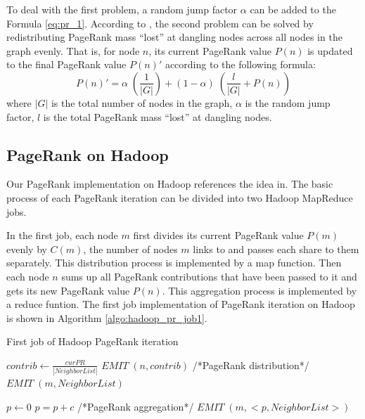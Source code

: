 \documentclass[10pt,conference,compsocconf]{IEEEtran}
\begin{document}
To deal with the first problem, a random jump factor $\alpha$ can be added to the Formula \ref{eq:pr_1}. According to \cite{monica2005}, the second problem can be solved by redistributing PageRank mass ``lost'' at dangling nodes across all nodes in the graph evenly. That is, for node $n$, its current PageRank value $P(n)$ is updated to the final PageRank value $P(n)'$ according to the following formula:
\begin{equation}
P(n)' = \alpha \; (\frac{1}{|G|}) + (1 - \alpha) \; (\frac{l}{|G|} + P(n)) \label{eq:pr_2}
\end{equation}
where $|G|$ is the total number of nodes in the graph, $\alpha$ is the random jump factor, $l$ is the total PageRank mass ``lost'' at dangling nodes.


\subsection{PageRank on Hadoop}
Our PageRank implementation on Hadoop references the idea in\cite{jimmy2010}. The basic process of each PageRank iteration can be divided into two Hadoop MapReduce jobs.

In the first job, each node $m$ first divides its current PageRank value $P(m)$ evenly by $C(m)$, the number of nodes $m$ links to and passes each share to them separately. This distribution process is implemented by a map function. Then each node $n$ sums up all PageRank contributions that have been passed to it and gets its new PageRank value $P(n)$. This aggregation process is implemented by a reduce funtion. The first job implementation of PageRank iteration on Hadoop is shown in Algorithm \ref{algo:hadoop_pr_job1}. 


\begin{algorithm}[!t]
\caption{First job of Hadoop PageRank iteration}
\label{algo:hadoop_pr_job1}
\begin{algorithmic}[1]
    \State $contrib \leftarrow \frac{curPR}{|NeighborList|}$ 
      \State $EMIT\;(n, contrib)$ {\small /*PageRank distribution*/}
    \EndFor    
  \State $EMIT\;(m, NeighborList)$   
\EndFunction
\end{algorithmic}
\;\;\;
\begin{algorithmic}[1]
  \State $p \leftarrow 0$
    \State $p = p + c$  {\small /*PageRank aggregation*/}
  \EndFor
  \State $EMIT\;(m, <p, NeighborList>)$
\EndFunction
\end{algorithmic}
\end{algorithm}
\end{document}
